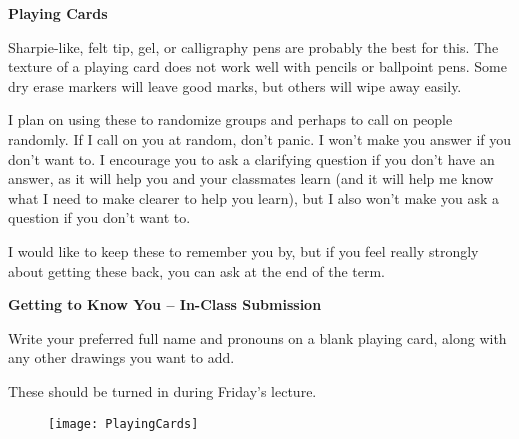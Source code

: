 \documentclass[]{article}
\begin{document}
\begin{TeacherMargin}
\noindent\textbf{Playing Cards}

Sharpie-like, felt tip, gel, or calligraphy pens are probably the best for this. The texture of a playing card does not work well with pencils or ballpoint pens. Some dry erase markers will leave good marks, but others will wipe away easily.

I plan on using these to randomize groups and perhaps to call on people randomly. If I call on you at random, don't panic. I won't make you answer if you don't want to. I encourage you to ask a clarifying question if you don't have an answer, as it will help you and your classmates learn (and it will help me know what I need to make clearer to help you learn), but I also won't make you ask a question if you don't want to.

I would like to keep these to remember you by, but if you feel really strongly about getting these back, you can ask at the end of the term.
\end{TeacherMargin}
\begin{PresentSpace}
\begin{center}
	\textbf{Getting to Know You -- In-Class Submission}
\end{center}
Write your preferred full name and pronouns on a blank playing card, along with any other drawings you want to add.

\noindent These should be turned in during Friday's lecture. \\
\begin{figure}[h]
	\centering
	\texttt{[image: PlayingCards]}
\end{figure}
\end{PresentSpace}
\newpage
\end{document}
